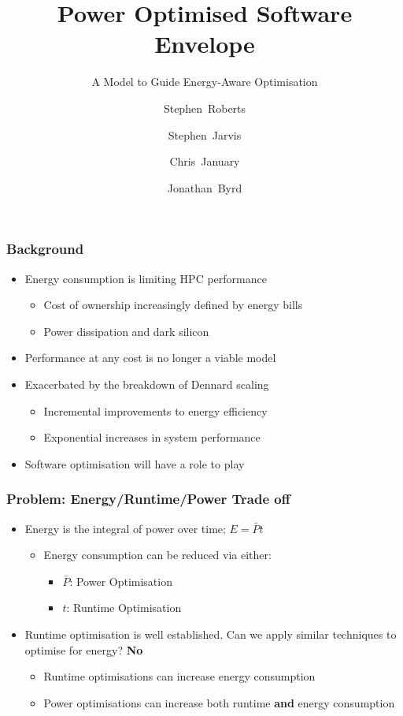 \documentclass{beamer}
\title[POSE] %
{Power Optimised Software Envelope}
\subtitle{A Model to Guide Energy-Aware Optimisation}
\author[Roberts et al.] %
{Stephen~Roberts\inst{1} \and Stephen~Jarvis\inst{1} \\
 \and Chris~January\inst{1} \and Jonathan~Byrd\inst{2}}
\institute[University of Warwick] %
{
    \inst{1}%
      Department of Computer Science\\
      The University of Warwick
    \and
      \inst{2}%
        Allinea Software
}
\begin{document}
  \frame{\titlepage}

  \begin{frame}
    \frametitle{Background}
    \begin{itemize}
      \item<1-> Energy consumption is limiting HPC performance
      \begin{itemize}
        \item Cost of ownership increasingly defined by energy bills
        \item Power dissipation and dark silicon
      \end{itemize}
      \item<2-> Performance at any cost is no longer a viable model
      \item<3-> Exacerbated by the breakdown of Dennard scaling
      \begin{itemize}
        \item Incremental improvements to energy efficiency 
        \item Exponential increases in system performance
      \end{itemize}
      \item<4-> Software optimisation will have a role to play
    \end{itemize}
  \end{frame}

  \begin{frame}
    \frametitle{Problem: Energy/Runtime/Power Trade off}
    \begin{itemize}
      \item<1-> Energy is the integral of power over time; $E = \bar{P}t$
      \begin{itemize}
      \item Energy consumption can be reduced via either:
      \begin{itemize}
        \item $\bar{P}$: Power Optimisation
        \item $t$: Runtime Optimisation
      \end{itemize}
      \end{itemize}
      \item<2-> Runtime optimisation is well established. Can we apply similar techniques to optimise for energy? \textbf{No}
       \begin{itemize}
        \item<3-> Runtime optimisations can increase energy consumption
        \item<3-> Power optimisations can increase both runtime \textbf{and} energy consumption
      \end{itemize}
    \end{itemize}
  \end{frame}
  
\end{document}
